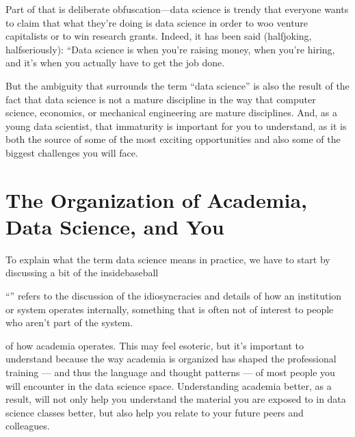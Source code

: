 \documentclass[letterpaper,10pt,english]{jupyterBook}
\begin{document}
\sphinxAtStartPar
Part of that is deliberate obfuscation—data science is  trendy that everyone wants to claim that what they’re doing is data science in order to woo venture capitalists or to win research grants. Indeed, it has been said (half\sphinxhyphen{}joking, half\sphinxhyphen{}seriously): “Data science is  when you’re raising money,  when you’re hiring, and it’s  when you actually have to get the job done.

\sphinxAtStartPar
But the ambiguity that surrounds the term “data science” is also the result of the fact that data science is not a mature discipline in the way that computer science, economics, or mechanical engineering are mature disciplines. And, as a young data scientist, that immaturity is important for you to understand, as it is both the source of some of the most exciting opportunities and also some of the biggest challenges you will face.


\section{The Organization of Academia, Data Science, and You}
\label{\detokenize{10_introduction/40_data_science_in_historical_context:the-organization-of-academia-data-science-and-you}}
\sphinxAtStartPar
To explain what the term data science means in practice, we have to start by discussing a bit of the inside\sphinxhyphen{}baseball%
\begin{footnote}[1]\sphinxAtStartFootnote
“” refers to the discussion of the idiosyncracies and details of how an institution or system operates internally, something that is often not of interest to people who aren’t part of the system.
%
\end{footnote} of how academia operates. This may feel esoteric, but it’s important to understand because the way academia is organized has shaped the professional training — and thus the language and thought patterns — of most people you will encounter in the data science space. Understanding academia better, as a result, will not only help you understand the material you are exposed to in data science classes better, but also help you relate to your future peers and colleagues.
\end{document}
